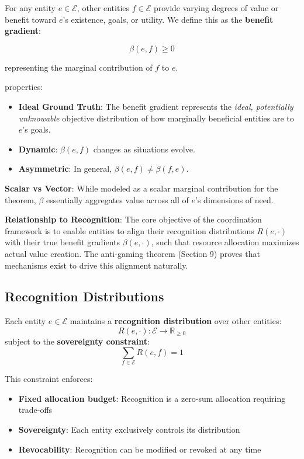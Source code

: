 \documentclass[11pt,a4paper]{article}
\theoremstyle{definition}
\theoremstyle{remark}
\newcommand{\E}{\mathcal{E}}
\begin{document}
For any entity $e \in \E$, other entities $f \in \E$ provide varying degrees of value or benefit toward $e$'s existence, goals, or utility. We define this as the \textbf{benefit gradient}:

\[ \beta(e, f) \ge 0 \]

representing the marginal contribution of $f$ to $e$.

properties:
\begin{itemize}
\item \textbf{Ideal Ground Truth}: The benefit gradient represents the \textit{ideal, potentially unknowable} objective distribution of how marginally beneficial entities are to $e$'s goals.
\item \textbf{Dynamic}: $\beta(e,f)$ changes as situations evolve.
\item \textbf{Asymmetric}: In general, $\beta(e,f) \ne \beta(f,e)$.
\end{itemize}

\textbf{Scalar vs Vector}: While modeled as a scalar marginal contribution for the theorem, $\beta$ essentially aggregates value across all of $e$'s dimensions of need.

\textbf{Relationship to Recognition}: The core objective of the coordination framework is to enable entities to align their recognition distributions $R(e,\cdot)$ with their true benefit gradients $\beta(e,\cdot)$, such that resource allocation maximizes actual value creation. The anti-gaming theorem (Section 9) proves that mechanisms exist to drive this alignment naturally.

\subsection{Recognition Distributions}

Each entity $e \in \E$ maintains a \textbf{recognition distribution} over other entities:
\[ R(e, \cdot): \E \rightarrow \mathbb{R}_{\ge 0} \]
subject to the \textbf{sovereignty constraint}:
\[ \sum_{f \in \E} R(e,f) = 1 \]

This constraint enforces:
\begin{itemize}
\item \textbf{Fixed allocation budget}: Recognition is a zero-sum allocation requiring trade-offs
\item \textbf{Sovereignty}: Each entity exclusively controls its distribution
\item \textbf{Revocability}: Recognition can be modified or revoked at any time
\end{itemize}
\end{document}
